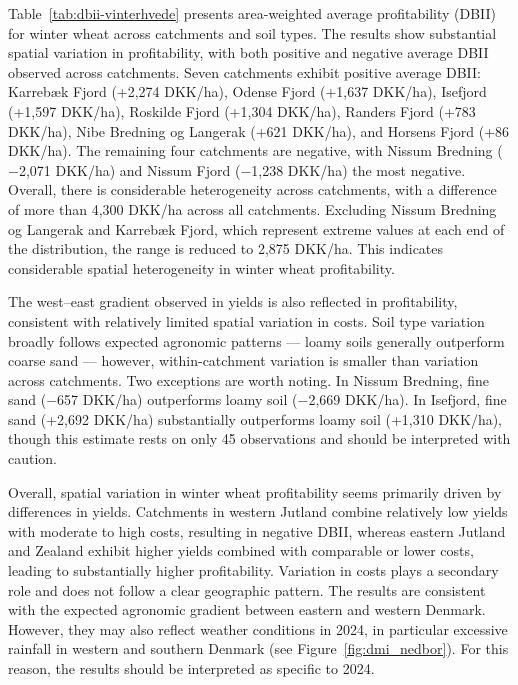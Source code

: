 \documentclass[12pt]{article}
\begin{document}
Table~\ref{tab:dbii-vinterhvede} presents area-weighted average profitability (DBII) for winter wheat across catchments and soil types.  The results show substantial spatial variation in profitability, with both positive and negative average DBII observed across catchments. Seven catchments exhibit positive average DBII: Karrebæk Fjord (+2,274 DKK/ha), Odense Fjord (+1,637 DKK/ha), Isefjord (+1,597 DKK/ha), Roskilde Fjord (+1,304 DKK/ha), Randers Fjord (+783 DKK/ha), Nibe Bredning og Langerak (+621 DKK/ha), and Horsens Fjord (+86 DKK/ha). The remaining four catchments are negative, with Nissum Bredning ($-$2,071 DKK/ha) and Nissum Fjord ($-$1,238 DKK/ha) the most negative. Overall, there is considerable heterogeneity across catchments, with a difference of more than 4,300 DKK/ha across all catchments. Excluding Nissum Bredning og Langerak and Karrebæk Fjord, which represent extreme values at each end of the distribution, the range is reduced to 2,875 DKK/ha. This indicates considerable spatial heterogeneity in winter wheat profitability.


The west--east gradient observed in yields is also reflected in profitability, consistent with relatively limited spatial variation in costs. Soil type variation broadly follows expected agronomic patterns --- loamy soils generally outperform coarse sand --- however, within-catchment variation is smaller than variation across catchments. Two exceptions are worth noting. In Nissum Bredning, fine sand ($-$657 DKK/ha) outperforms loamy soil ($-$2,669 DKK/ha). In Isefjord, fine sand (+2,692 DKK/ha) substantially outperforms loamy soil (+1,310 DKK/ha), though this estimate rests on only 45 observations and should be interpreted with caution.

Overall, spatial variation in winter wheat profitability seems primarily driven by differences in yields. Catchments in western Jutland combine relatively low yields with moderate to high costs, resulting in negative DBII, whereas eastern Jutland and Zealand exhibit higher yields combined with comparable or lower costs, leading to substantially higher profitability. Variation in costs plays a secondary role and does not follow a clear geographic pattern. The results are consistent with the expected agronomic gradient between eastern and western Denmark. However, they may also reflect weather conditions in 2024, in particular excessive rainfall in western and southern Denmark (see Figure~\ref{fig:dmi_nedbor}). For this reason, the results should be interpreted as specific to 2024. 
\end{document}
